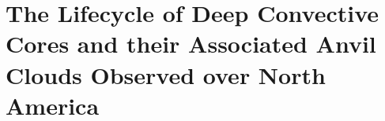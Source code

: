 \chapter{The Lifecycle of Deep Convective Cores and their Associated Anvil Clouds Observed over North America}








